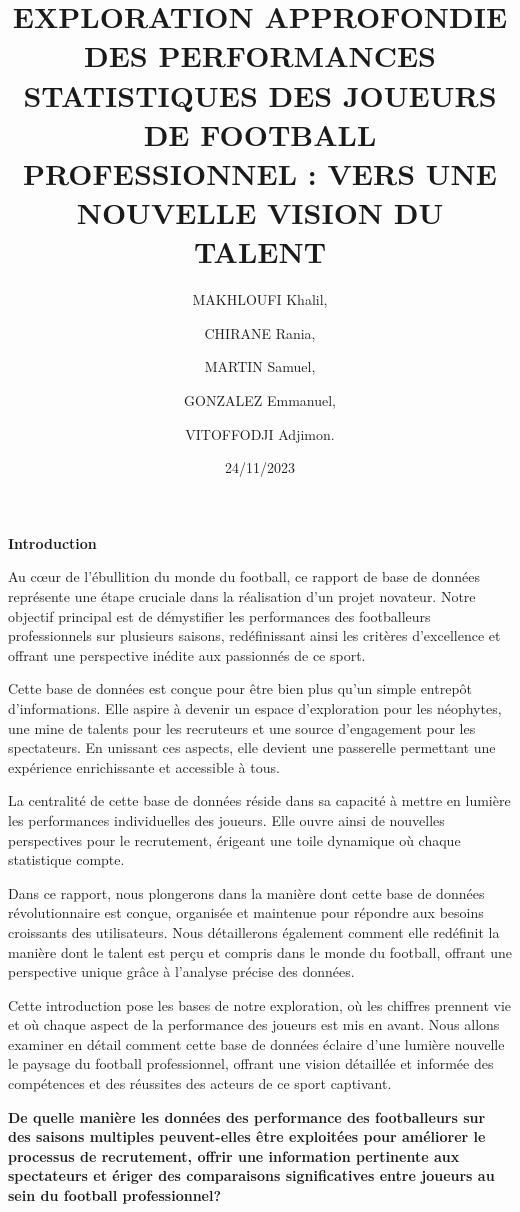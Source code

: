 \documentclass[
]{article}
\title{EXPLORATION APPROFONDIE DES PERFORMANCES STATISTIQUES DES JOUEURS
DE FOOTBALL PROFESSIONNEL : VERS UNE NOUVELLE VISION DU TALENT}
\author{MAKHLOUFI Khalil, \and CHIRANE Rania, \and MARTIN
Samuel, \and GONZALEZ Emmanuel, \and VITOFFODJI Adjimon.}
\date{24/11/2023}
\begin{document}
\maketitle

\renewcommand*\contentsname{Table des matières}
{
\setcounter{tocdepth}{1}
\tableofcontents
}
\textbf{Introduction }

\bigskip

Au cœur de l'ébullition du monde du football, ce rapport de base de
données représente une étape cruciale dans la réalisation d'un projet
novateur. Notre objectif principal est de démystifier les performances
des footballeurs professionnels sur plusieurs saisons, redéfinissant
ainsi les critères d'excellence et offrant une perspective inédite aux
passionnés de ce sport.

Cette base de données est conçue pour être bien plus qu'un simple
entrepôt d'informations. Elle aspire à devenir un espace d'exploration
pour les néophytes, une mine de talents pour les recruteurs et une
source d'engagement pour les spectateurs. En unissant ces aspects, elle
devient une passerelle permettant une expérience enrichissante et
accessible à tous.

La centralité de cette base de données réside dans sa capacité à mettre
en lumière les performances individuelles des joueurs. Elle ouvre ainsi
de nouvelles perspectives pour le recrutement, érigeant une toile
dynamique où chaque statistique compte.

Dans ce rapport, nous plongerons dans la manière dont cette base de
données révolutionnaire est conçue, organisée et maintenue pour répondre
aux besoins croissants des utilisateurs. Nous détaillerons également
comment elle redéfinit la manière dont le talent est perçu et compris
dans le monde du football, offrant une perspective unique grâce à
l'analyse précise des données.

Cette introduction pose les bases de notre exploration, où les chiffres
prennent vie et où chaque aspect de la performance des joueurs est mis
en avant. Nous allons examiner en détail comment cette base de données
éclaire d'une lumière nouvelle le paysage du football professionnel,
offrant une vision détaillée et informée des compétences et des
réussites des acteurs de ce sport captivant.

\bigskip

\centering

\textbf{De quelle manière les données des performance des footballeurs
sur des saisons multiples peuvent-elles être exploitées pour améliorer
le processus de recrutement, offrir une information pertinente aux
spectateurs et ériger des comparaisons significatives entre joueurs au
sein du football professionnel? }
\end{document}

